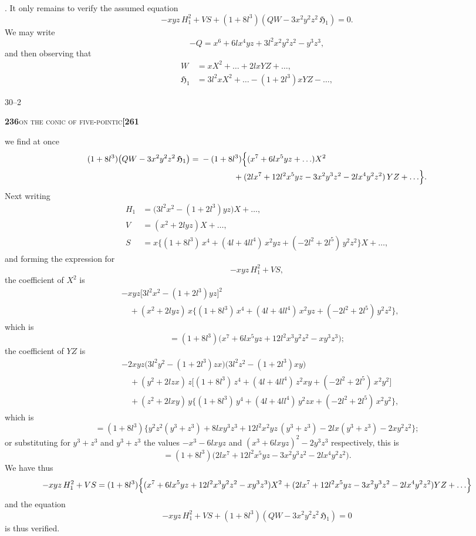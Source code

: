 \documentclass[11pt]{article}
\begin{document}
. It only remains to verify the assumed equation
\[
  -xyz\,H_1^2 + V S + (1 + 8l^3)(Q W - 3 x^2 y^2 z^2\,\mathfrak{H}_1) = 0.
\]
We may write
\[
  -Q = x^6 + 6lx^4 yz + 3l^2 x^2 y^2 z^2 - y^3 z^3,
\]
and then observing that
\[
\begin{aligned}
  W &= xX^2 + \ldots + 2lx YZ + \ldots,\\
  \mathfrak{H}_1 &= 3l^2 x X^2 + \ldots - (1 + 2l^3) x YZ - \ldots,
\end{aligned}
\]

\medskip

\hfill {\footnotesize 30--2}

\newpage
\noindent\textbf{236}\hfill\textsc{on the conic of five-pointic}\hfill\textbf{[261}

\medskip

\noindent we find at once
\[
\begin{aligned}
  (1 + 8l^3)\bigl(QW - 3x^2 y^2 z^2\,\mathfrak{H}_1\bigr) ={}& -(1 + 8l^3)\Bigl\{ (x^7 + 6lx^5 yz + \ldots) X^2\\
  &\hspace{4em}{} + (2lx^7 + 12l^2 x^5 yz - 3x^2 y^3 z^2 - 2lx^4 y^2 z^2)\,YZ + \ldots \Bigr\}.
\end{aligned}
\]
Next writing
\[
\begin{aligned}
  H_1 &= \bigl(3l^2 x^2 - (1 + 2l^3) yz\bigr) X + \ldots,\\
  V   &= (x^2 + 2lyz) X + \ldots,\\
  S   &= x\bigl\{ (1 + 8l^3)\,x^4 + (4l + 4ll^4)\,x^2 yz + (-2l^2 + 2l^5)\,y^2 z^2 \bigr\} X + \ldots,
\end{aligned}
\]
and forming the expression for
\[
  -xyz\,H_1^2 + V S,
\]
the coefficient of $X^2$ is
\[
\begin{aligned}
  & -xyz\bigl[3l^2 x^2 - (1 + 2l^3) yz\bigr]^2\\
  &\quad + (x^2 + 2lyz)\,x\bigl\{ (1 + 8l^3)\,x^4 + (4l + 4ll^4)\,x^2 yz + (-2l^2 + 2l^5)\,y^2 z^2 \bigr\},
\end{aligned}
\]
which is
\[
  = (1 + 8l^3)\bigl(x^7 + 6lx^5 yz + 12l^2 x^3 y^2 z^2 - x y^3 z^3\bigr);
\]
the coefficient of $YZ$ is
\[
\begin{aligned}
  & -2xyz\bigl(3l^2 y^2 - (1 + 2l^3) zx\bigr)\bigl(3l^2 z^2 - (1 + 2l^3) xy\bigr)\\
  &\quad + (y^2 + 2lzx)\,z\bigl[(1 + 8l^3)\,z^4 + (4l + 4ll^4)\,z^2 xy + (-2l^2 + 2l^5)\,x^2 y^2\bigr]\\
  &\quad + (z^2 + 2lxy)\,y\bigl\{ (1 + 8l^3)\,y^4 + (4l + 4ll^4)\,y^2 zx + (-2l^2 + 2l^5)\,x^2 y^2 \bigr\},
\end{aligned}
\]
which is
\[
  = (1 + 8l^3)\bigl\{ y^2 z^2(y^3 + z^3) + 8lxy^3 z^3 + 12l^2 x^2 yz\,(y^3 + z^3) - 2lx(y^3 + z^3) - 2xy^2 z^2 \bigr\};
\]
or substituting for $y^3 + z^3$ and $y^3 + z^3$ the values $-x^3 - 6lxyz$ and $(x^3 + 6lxyz)^2 - 2y^3 z^3$ respectively, this is
\[
  = (1 + 8l^3)\bigl(2lx^7 + 12l^2 x^5 yz - 3 x^2 y^3 z^2 - 2lx^4 y^2 z^2\bigr).
\]
We have thus
\[
  -xyz\,H_1^2 + V S = (1 + 8l^3)\Bigl\{ (x^7 + 6lx^5 yz + 12l^2 x^3 y^2 z^2 - x y^3 z^3) X^2 + (2lx^7 + 12l^2 x^5 yz - 3 x^2 y^3 z^2 - 2lx^4 y^2 z^2) YZ + \ldots \Bigr\}
\]
and the equation
\[
  -xyz\,H_1^2 + V S + (1 + 8l^3)(Q W - 3 x^2 y^2 z^2\,\mathfrak{H}_1) = 0
\]
is thus verified.
\end{document}
